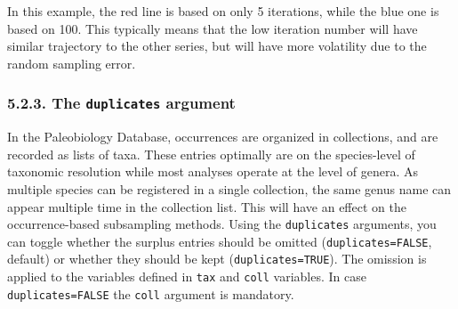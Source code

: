 \documentclass[]{article}
\begin{document}
In this example, the red line is based on only 5 iterations, while the
blue one is based on 100. This typically means that the low iteration
number will have similar trajectory to the other series, but will have
more volatility due to the random sampling error.

\subsubsection{\texorpdfstring{5.2.3. The \texttt{duplicates}
argument}{5.2.3. The duplicates argument}}\label{the-duplicates-argument}

In the Paleobiology Database, occurrences are organized in collections,
and are recorded as lists of taxa. These entries optimally are on the
species-level of taxonomic resolution while most analyses operate at the
level of genera. As multiple species can be registered in a single
collection, the same genus name can appear multiple time in the
collection list. This will have an effect on the occurrence-based
subsampling methods. Using the \texttt{duplicates} arguments, you can
toggle whether the surplus entries should be omitted
(\texttt{duplicates=FALSE}, default) or whether they should be kept
(\texttt{duplicates=TRUE}). The omission is applied to the variables
defined in \texttt{tax} and \texttt{coll} variables. In case
\texttt{duplicates=FALSE} the \texttt{coll} argument is mandatory.
\end{document}
